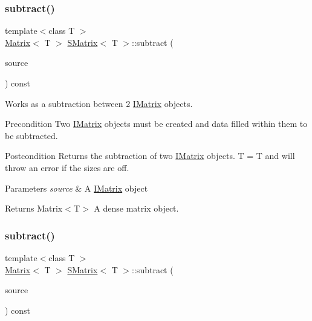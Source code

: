 \subsubsection{\texorpdfstring{subtract()}{subtract()}\hspace{0.1cm}{\footnotesize\ttfamily [1/6]}}
{\footnotesize\ttfamily template$<$class T $>$ \\
\mbox{\hyperlink{class_matrix}{Matrix}}$<$ T $>$ \mbox{\hyperlink{class_s_matrix}{S\+Matrix}}$<$ T $>$\+::subtract (\begin{DoxyParamCaption}\item[{const \mbox{\hyperlink{class_i_matrix}{I\+Matrix}}$<$ \mbox{\hyperlink{class_matrix}{Matrix}}$<$ T $>$, T $>$ \&}]{source }\end{DoxyParamCaption}) const}



Works as a subtraction between 2 \mbox{\hyperlink{class_i_matrix}{I\+Matrix}} objects. 

\begin{DoxyPrecond}{Precondition}
Two \mbox{\hyperlink{class_i_matrix}{I\+Matrix}} objects must be created and data filled within them to be subtracted. 
\end{DoxyPrecond}
\begin{DoxyPostcond}{Postcondition}
Returns the subtraction of two \mbox{\hyperlink{class_i_matrix}{I\+Matrix}} objects. T = T and will throw an error if the sizes are off.
\end{DoxyPostcond}

\begin{DoxyParams}{Parameters}
{\em source} & A \mbox{\hyperlink{class_i_matrix}{I\+Matrix}} object \\
\hline
\end{DoxyParams}
\begin{DoxyReturn}{Returns}
Matrix$<$\+T$>$ A dense matrix object. 
\end{DoxyReturn}
\mbox{\label{class_s_matrix_a6d1a4242c4ff9f151c8141fef7784f8d}} 
\subsubsection{\texorpdfstring{subtract()}{subtract()}\hspace{0.1cm}{\footnotesize\ttfamily [2/6]}}
{\footnotesize\ttfamily template$<$class T $>$ \\
\mbox{\hyperlink{class_matrix}{Matrix}}$<$ T $>$ \mbox{\hyperlink{class_s_matrix}{S\+Matrix}}$<$ T $>$\+::subtract (\begin{DoxyParamCaption}\item[{const \mbox{\hyperlink{class_i_matrix}{I\+Matrix}}$<$ \mbox{\hyperlink{class_t_matrix}{T\+Matrix}}$<$ T $>$, T $>$ \&}]{source }\end{DoxyParamCaption}) const}



